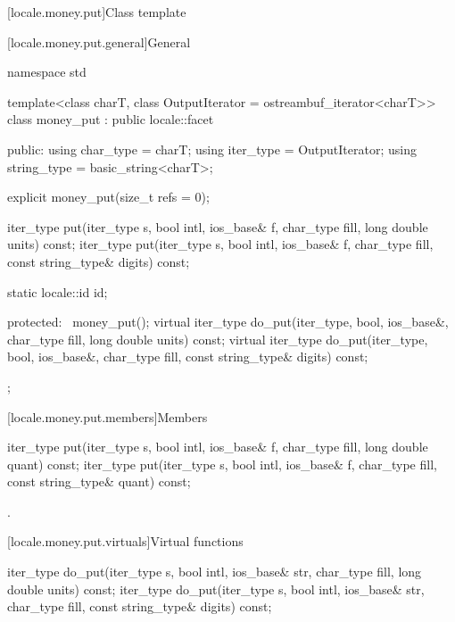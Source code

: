 [locale.money.put]{Class template }

[locale.money.put.general]{General}

%
\begin{codeblock}
namespace std {
  template<class charT, class OutputIterator = ostreambuf_iterator<charT>>
    class money_put : public locale::facet {
    public:
      using char_type   = charT;
      using iter_type   = OutputIterator;
      using string_type = basic_string<charT>;

      explicit money_put(size_t refs = 0);

      iter_type put(iter_type s, bool intl, ios_base& f,
                    char_type fill, long double units) const;
      iter_type put(iter_type s, bool intl, ios_base& f,
                    char_type fill, const string_type& digits) const;

      static locale::id id;

    protected:
      ~money_put();
      virtual iter_type do_put(iter_type, bool, ios_base&, char_type fill,
                               long double units) const;
      virtual iter_type do_put(iter_type, bool, ios_base&, char_type fill,
                               const string_type& digits) const;
    };
}
\end{codeblock}

[locale.money.put.members]{Members}

%
\begin{itemdecl}
iter_type put(iter_type s, bool intl, ios_base& f, char_type fill, long double quant) const;
iter_type put(iter_type s, bool intl, ios_base& f, char_type fill, const string_type& quant) const;
\end{itemdecl}

\begin{itemdescr}
\pnum
\returns
{}.
\end{itemdescr}

[locale.money.put.virtuals]{Virtual functions}

%
\begin{itemdecl}
iter_type do_put(iter_type s, bool intl, ios_base& str,
                 char_type fill, long double units) const;
iter_type do_put(iter_type s, bool intl, ios_base& str,
                 char_type fill, const string_type& digits) const;
\end{itemdecl}

